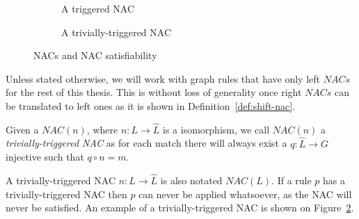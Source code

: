 \begin{example}
\begin{figure}[!ht]
\begin{subfigure}[t]{.5\textwidth}
    \caption{A triggered NAC}\label{fig:gts:nacs:triggered}
  \end{subfigure}
  \begin{subfigure}[t]{.5\textwidth}
    \centerline{}
    \caption{A trivially-triggered NAC}\label{fig:gts:nacs:trivial}
  \end{subfigure}
  \caption{NACs and NAC satisfiability}\label{fig:gts:nacs}
\end{figure}
\end{example}

\begin{assumption} Unless stated otherwise, we will work with graph rules that have only left $NACs$ for the rest of this thesis. This is without loss of generality once right $NACs$ can be translated to left ones as it is shown in Definition~\ref{def:shift-nac}.
\end{assumption}

\begin{definition}  Given a $NAC(n)$, where $n : L \rightarrow \hat{L}$ is a isomorphism, we call $NAC(n)$ a \emph{trivially-triggered NAC} as for each match \match{} there will always exist a $q : \hat{L} \rightarrow G$ injective such that $q \circ n = m$.

  A trivially-triggered NAC $n : L \rightarrow \hat{L}$ is also notated $NAC(L)$. If a rule $p$ has a trivially-triggered NAC then $p$ can never be applied whatsoever, as the NAC will never be satisfied. An example of a trivially-triggered NAC is shown on Figure~\ref{fig:gts:nacs:trivial}.
\end{definition}

